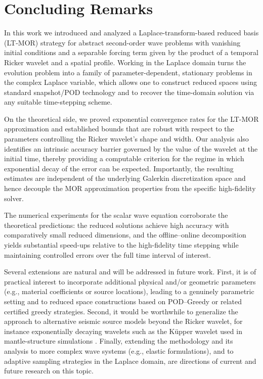 \section{Concluding Remarks}
\label{sec:concluding_remarks}
In this work we introduced and analyzed a Laplace-transform-based reduced basis (LT-MOR)
strategy for abstract second-order wave problems with vanishing initial conditions and a
separable forcing term given by the product of a temporal Ricker wavelet and a spatial
profile. Working in the Laplace domain turns the evolution problem into a family of
parameter-dependent, stationary problems in the complex Laplace variable, which allows one
to construct reduced spaces using standard snapshot/POD technology and to recover the
time-domain solution via any suitable time-stepping scheme.

On the theoretical side, we proved exponential convergence rates for the LT-MOR
approximation and established bounds that are robust with respect to the parameters
controlling the Ricker wavelet's shape and width. Our analysis also identifies an intrinsic
accuracy barrier governed by the value of the wavelet at the initial time, thereby providing
a computable criterion for the regime in which exponential decay of the error can be
expected. Importantly, the resulting estimates are independent of the underlying Galerkin
discretization space and hence decouple the MOR approximation properties from the specific
high-fidelity solver.

The numerical experiments for the scalar wave equation corroborate the theoretical
predictions: the reduced solutions achieve high accuracy with comparatively small reduced
dimensions, and the offline--online decomposition yields substantial speed-ups relative to
the high-fidelity time stepping while maintaining controlled errors over the full time
interval of interest.

Several extensions are natural and will be addressed in future work. First, it is of
practical interest to incorporate additional physical and/or geometric parameters (e.g.,
material coefficients or source locations), leading to a genuinely parametric setting and
to reduced space constructions based on POD--Greedy or related certified greedy strategies.
Second, it would be worthwhile to generalize the approach to alternative seismic source
models beyond the Ricker wavelet, for instance exponentially decaying wavelets such as the
K\"upper wavelet used in mantle-structure simulations \cite{igel1993p}. Finally, extending
the methodology and its analysis to more complex wave systems (e.g., elastic formulations),
and to adaptive sampling strategies in the Laplace domain, are directions of current and
future research on this topic. 

